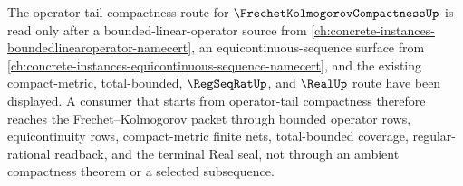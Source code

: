The operator-tail compactness route for $\FrechetKolmogorovCompactnessUp$ is read only after a bounded-linear-operator source from \autoref{ch:concrete-instances-boundedlinearoperator-namecert}, an equicontinuous-sequence surface from \autoref{ch:concrete-instances-equicontinuous-sequence-namecert}, and the existing compact-metric, total-bounded, $\RegSeqRatUp$, and $\RealUp$ route have been displayed.
A consumer that starts from operator-tail compactness therefore reaches the Frechet--Kolmogorov packet through bounded operator rows, equicontinuity rows, compact-metric finite nets, total-bounded coverage, regular-rational readback, and the terminal Real seal, not through an ambient compactness theorem or a selected subsequence.
